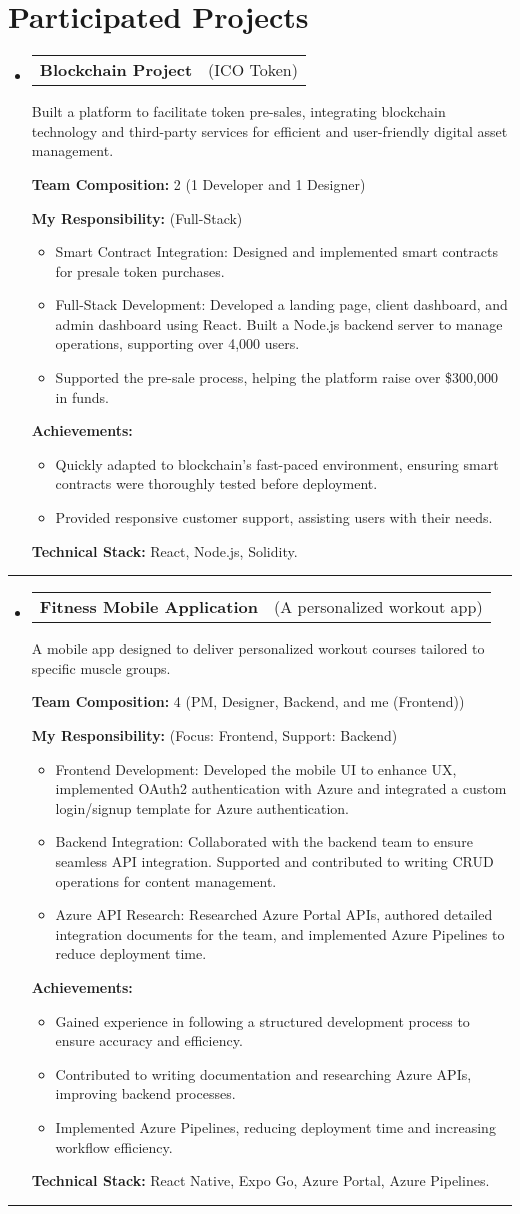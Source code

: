 \documentclass[letterpaper,11pt]{article}
\makeatletter
\newcommand{\resumeProjectTitle}[2]{
  \vspace{-2pt}\item
    \begin{tabular*}{1\textwidth}[t]{l @{\hskip 2pt} r}
      \textbf{#1} & \small #2 \\
    \end{tabular*}\vspace{2pt}
}
\newcommand{\resumeDesc}[1]{
  {#1\\ \vspace{2px}}
}
\newcommand{\resumeItem}[1]{
  \item{#1 \vspace{-2pt}}
}
\newcommand{\resumeItemListTitle}[1]{%
  \vspace{0pt} \textbf{#1} \vspace{-2pt}%
}
\newcommand{\resumeItemListStart}{\vspace{-4pt}\begin{itemize}[leftmargin=12px]}
\newcommand{\resumeItemListEnd}{\end{itemize}\vspace{-5pt}}
\newcommand{\resumeSubHeadingListStart}{\begin{itemize}[leftmargin=0pt, label={}]}
\newcommand{\resumeSubHeadingListEnd}{\end{itemize}\vspace{-8pt}}
\makeatother
\begin{document}
\section{Participated Projects}
\resumeSubHeadingListStart
\resumeProjectTitle{Blockchain Project}{(ICO Token)}
\resumeDesc{Built a platform to facilitate token pre-sales, integrating blockchain technology and third-party services for efficient and user-friendly digital asset management.}
\resumeItemListTitle{Team Composition:} 2 (1 Developer and 1 Designer)
\par
\resumeItemListTitle{My Responsibility:} (Full-Stack)
\resumeItemListStart
    \resumeItem{Smart Contract Integration: Designed and implemented smart contracts for presale token purchases.}
    \resumeItem{Full-Stack Development: Developed a landing page, client dashboard, and admin dashboard using React. Built a Node.js backend server to manage operations, supporting over 4,000 users.}
    \resumeItem{Supported the pre-sale process, helping the platform raise over \$300,000 in funds.}
\resumeItemListEnd
\resumeItemListTitle{Achievements:}
\resumeItemListStart
    \resumeItem{Quickly adapted to blockchain's fast-paced environment, ensuring smart contracts were thoroughly tested before deployment.}
    \resumeItem{Provided responsive customer support, assisting users with their needs.}
\resumeItemListEnd
\resumeItemListTitle{Technical Stack:} React, Node.js, Solidity.
\resumeSubHeadingListEnd
\noindent\rule{\textwidth}{0.4pt}
\resumeSubHeadingListStart
\resumeProjectTitle{Fitness Mobile Application}{(A personalized workout app)}
\resumeDesc{A mobile app designed to deliver personalized workout courses tailored to specific muscle groups.}
\resumeItemListTitle{Team Composition:} 4 (PM, Designer, Backend, and me (Frontend))
\par
\resumeItemListTitle{My Responsibility:} (Focus: Frontend, Support: Backend)
\resumeItemListStart
    \resumeItem{Frontend Development: Developed the mobile UI to enhance UX, implemented OAuth2 authentication with Azure and integrated a custom login/signup template for Azure authentication.}
    \resumeItem{Backend Integration: Collaborated with the backend team to ensure seamless API integration. Supported and contributed to writing CRUD operations for content management. }
    \resumeItem{Azure API Research: Researched Azure Portal APIs, authored detailed integration documents for the team, and implemented Azure Pipelines to reduce deployment time.}
\resumeItemListEnd
\resumeItemListTitle{Achievements:}
\resumeItemListStart
    \resumeItem{Gained experience in following a structured development process to ensure accuracy and efficiency.}
    \resumeItem{Contributed to writing documentation and researching Azure APIs, improving backend processes.}
    \resumeItem{Implemented Azure Pipelines, reducing deployment time and increasing workflow efficiency.}
\resumeItemListEnd
\resumeItemListTitle{Technical Stack:} React Native, Expo Go, Azure Portal, Azure Pipelines.
\resumeSubHeadingListEnd
\noindent\rule{\textwidth}{0.4pt}
\end{document}
